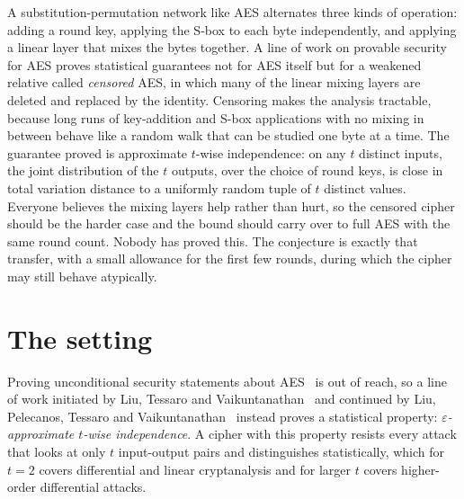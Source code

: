 \documentclass{aicr-conjecture}
\begin{document}

\vspace{0.4em}

\begin{informalconjecture}
A substitution-permutation network like AES alternates three kinds of
operation: adding a round key, applying the S-box to each byte
independently, and applying a linear layer that mixes the bytes together.
A line of work on provable security for AES proves statistical guarantees
not for AES itself but for a weakened relative called \emph{censored} AES,
in which many of the linear mixing layers are deleted and replaced by the
identity. Censoring makes the analysis tractable, because long runs of
key-addition and S-box applications with no mixing in between behave like
a random walk that can be studied one byte at a time. The guarantee proved
is approximate $t$-wise independence: on any $t$ distinct inputs, the joint
distribution of the $t$ outputs, over the choice of round keys, is close in
total variation distance to a uniformly random tuple of $t$ distinct
values. Everyone believes the mixing layers help rather than hurt, so the
censored cipher should be the harder case and the bound should carry over
to full AES with the same round count. Nobody has proved this. The
conjecture is exactly that transfer, with a small allowance for the first
few rounds, during which the cipher may still behave atypically.
\end{informalconjecture}

\section{The setting}\label{sec:setting}

Proving unconditional security statements about AES~\cite{DR02} is out of
reach, so a line of work initiated by Liu, Tessaro and
Vaikuntanathan~\cite{LTV21} and continued by Liu, Pelecanos, Tessaro and
Vaikuntanathan~\cite{LPTV23} instead proves a statistical property:
\emph{$\varepsilon$-approximate $t$-wise independence}. A cipher with this
property resists every attack that looks at only $t$ input-output pairs and
distinguishes statistically, which for $t = 2$ covers differential and
linear cryptanalysis and for larger $t$ covers higher-order differential
attacks.
\end{document}
